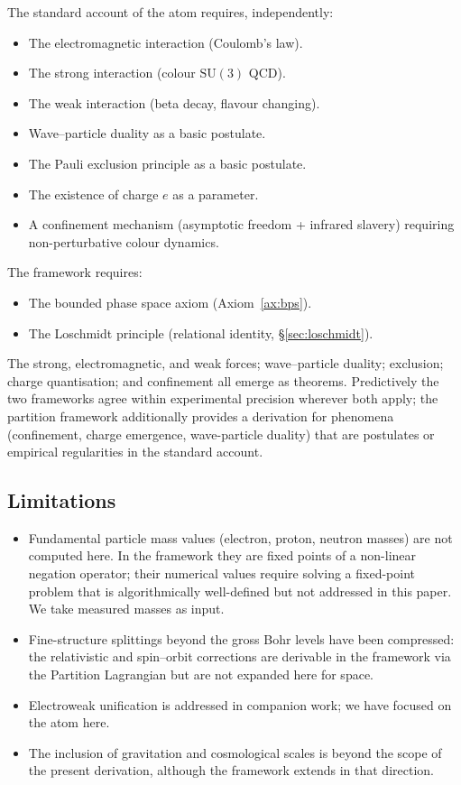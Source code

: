 \documentclass[11pt,a4paper]{article}
\theoremstyle{definition}
\theoremstyle{remark}
\begin{document}
The standard account of the atom requires, independently:
\begin{itemize}[leftmargin=2em,itemsep=2pt]
\item The electromagnetic interaction (Coulomb's law).
\item The strong interaction (colour $\mathrm{SU}(3)$ QCD).
\item The weak interaction (beta decay, flavour changing).
\item Wave--particle duality as a basic postulate.
\item The Pauli exclusion principle as a basic postulate.
\item The existence of charge $e$ as a parameter.
\item A confinement mechanism (asymptotic freedom + infrared slavery) requiring non-perturbative colour dynamics.
\end{itemize}

The framework requires:
\begin{itemize}[leftmargin=2em,itemsep=2pt]
\item The bounded phase space axiom (Axiom~\ref{ax:bps}).
\item The Loschmidt principle (relational identity, \S\ref{sec:loschmidt}).
\end{itemize}

The strong, electromagnetic, and weak forces; wave--particle duality; exclusion; charge quantisation; and confinement all emerge as theorems. Predictively the two frameworks agree within experimental precision wherever both apply; the partition framework additionally provides a derivation for phenomena (confinement, charge emergence, wave-particle duality) that are postulates or empirical regularities in the standard account.

\subsection{Limitations}

\begin{itemize}[leftmargin=2em,itemsep=2pt]
\item Fundamental particle mass values (electron, proton, neutron masses) are not computed here. In the framework they are fixed points of a non-linear negation operator; their numerical values require solving a fixed-point problem that is algorithmically well-defined but not addressed in this paper. We take measured masses as input.
\item Fine-structure splittings beyond the gross Bohr levels have been compressed: the relativistic and spin--orbit corrections are derivable in the framework via the Partition Lagrangian but are not expanded here for space.
\item Electroweak unification is addressed in companion work; we have focused on the atom here.
\item The inclusion of gravitation and cosmological scales is beyond the scope of the present derivation, although the framework extends in that direction.
\end{itemize}
\end{document}
